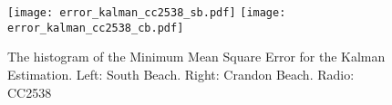 \begin{figure}
	\centering
	\texttt{[image: error\_kalman\_cc2538\_sb.pdf]}
	\texttt{[image: error\_kalman\_cc2538\_cb.pdf]}\caption{The histogram of the Minimum Mean Square Error for the Kalman Estimation. Left: South Beach. Right: Crandon Beach. Radio: CC2538}
	\label{fig:error_kalman_cc2538}
\end{figure}




